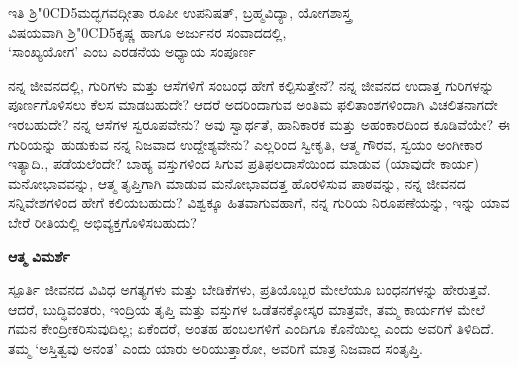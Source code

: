 \begin{center}
{\color{brown}
ಇತಿ ಶ್ರಿ\!\char"0CD5ಮದ್ಭಗವದ್ಗೀತಾ  ರೂಪೀ ಉಪನಿಷತ್, ಬ್ರಹ್ಮವಿದ್ಯಾ, ಯೋಗಶಾಸ್ತ್ರ\\ ವಿಷಯವಾಗಿ ಶ್ರಿ\!\char"0CD5ಕೃಷ್ಣ ಹಾಗೂ ಅರ್ಜುನರ ಸಂವಾದದಲ್ಲಿ, \\‘ಸಾಂಖ್ಯಯೋಗ’ ಎಂಬ ಎರಡನೆಯ ಅಧ್ಯಾಯ  ಸಂಪೂರ್ಣ}
\end{center}

\newpage
\begin{mananam}{}
\small \mananatext ನನ್ನ ಜೀವನದಲ್ಲಿ, ಗುರಿಗಳು ಮತ್ತು ಆಸೆಗಳಿಗೆ ಸಂಬಂಧ ಹೇಗೆ ಕಲ್ಪಿಸುತ್ತೇನೆ? ನನ್ನ ಜೀವನದ ಉದಾತ್ತ   ಗುರಿಗಳನ್ನು ಪೂರ್ಣಗೊಳಿಸಲು ಕೆಲಸ ಮಾಡಬಹುದೇ? ಆದರೆ ಅದರಿಂದಾಗುವ ಅಂತಿಮ ಫಲಿತಾಂಶಗಳಿಂದಾಗಿ ವಿಚಲಿತನಾಗದೇ ಇರಬಹುದೇ? ನನ್ನ ಆಸೆಗಳ ಸ್ವರೂಪವೇನು? ಅವು ಸ್ವಾರ್ಥತೆ, ಹಾನಿಕಾರಕ ಮತ್ತು ಅಹಂಕಾರದಿಂದ ಕೂಡಿವೆಯೇ? ಈ ಗುರಿಯನ್ನು ಹುಡುಕುವ ನನ್ನ ನಿಜವಾದ ಉದ್ದೇಶ್ಯವೇನು? ಎಲ್ಲರಿಂದ ಸ್ವೀಕೃತಿ, ಆತ್ಮ ಗೌರವ, ಸ್ವಯಂ  ಅಂಗೀಕಾರ ಇತ್ಯಾದಿ., ಪಡೆಯಲೆಂದೇ?  ಬಾಹ್ಯ ವಸ್ತುಗಳಿಂದ ಸಿಗುವ ಪ್ರತಿಫಲದಾಸೆಯಿಂದ ಮಾಡುವ (ಯಾವುದೇ ಕಾರ್ಯ) ಮನೋಭಾವವನ್ನು, ಆತ್ಮ ತೃಪ್ತಿಗಾಗಿ ಮಾಡುವ ಮನೋಭಾವದತ್ತ ಹೊರಳಿಸುವ ಪಾಠವನ್ನು, ನನ್ನ ಜೀವನದ ಸನ್ನಿವೇಶಗಳಿಂದ ಹೇಗೆ ಕಲಿಯಬಹುದು? ವಿಶ್ವಕ್ಕೂ ಹಿತವಾಗುವಹಾಗೆ, ನನ್ನ ಗುರಿಯ ನಿರೂಪಣೆಯನ್ನು, ಇನ್ನು ಯಾವ ಬೇರೆ ರೀತಿಯಲ್ಲಿ  ಅಭಿವ್ಯಕ್ತಗೊಳಿಸಬಹುದು? 
\end{mananam}
\WritingHand\enspace\textbf{ಆತ್ಮ ವಿಮರ್ಶೆ}
\begin{inspiration}{\mananamfont ಸ್ಪೂರ್ತಿ}
\small \mananatext ಜೀವನದ ವಿವಿಧ ಅಗತ್ಯಗಳು ಮತ್ತು ಬೇಡಿಕೆಗಳು, ಪ್ರತಿಯೊಬ್ಬರ ಮೇಲೆಯೂ ಬಂಧನಗಳನ್ನು ಹೇರುತ್ತವೆ. ಆದರೆ, ಬುದ್ಧಿವಂತರು, ಇಂದ್ರಿಯ ತೃಪ್ತಿ ಮತ್ತು ವಸ್ತುಗಳ ಒಡೆತನಕ್ಕೋಸ್ಕರ  ಮಾತ್ರವೇ, ತಮ್ಮ ಕಾರ್ಯಗಳ ಮೇಲೆ ಗಮನ ಕೇಂದ್ರೀಕರಿಸುವುದಿಲ್ಲ; ಏಕೆಂದರೆ,  ಅಂತಹ ಹಂಬಲಗಳಿಗೆ ಎಂದಿಗೂ ಕೊನೆಯಿಲ್ಲ ಎಂದು ಅವರಿಗೆ ತಿಳಿದಿದೆ.
 ತಮ್ಮ ‘ಅಸ್ತಿತ್ವವು ಅನಂತ’ ಎಂದು ಯಾರು ಅರಿಯುತ್ತಾರೋ, ಅವರಿಗೆ ಮಾತ್ರ ನಿಜವಾದ ಸಂತೃಪ್ತಿ.
\end{inspiration}


